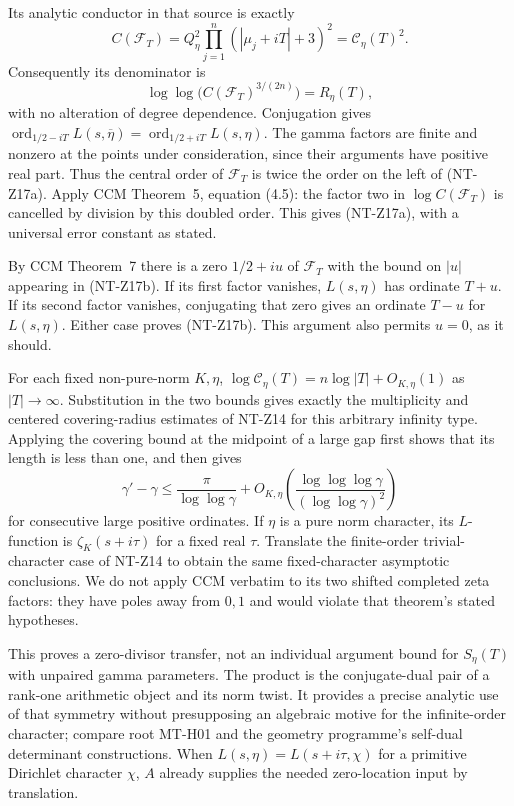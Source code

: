 \documentclass[11pt,a4paper]{article}
\begin{document}
Its analytic conductor in that source is exactly
\[
 C(\mathcal F_T)=Q_\eta^2
       \prod_{j=1}^n(|\mu_j+iT|+3)^2
       =\mathscr C_\eta(T)^2.
\]
Consequently its denominator is
\[
 \log\log\bigl(C(\mathcal F_T)^{3/(2n)}\bigr)
                  =R_\eta(T),
\]
with no alteration of degree dependence.
Conjugation gives
$\operatorname{ord}_{1/2-iT}L(s,\overline\eta)
=\operatorname{ord}_{1/2+iT}L(s,\eta)$.
The gamma factors are finite and nonzero at the points under
consideration, since their arguments have positive real part.
Thus the central order of $\mathcal F_T$ is twice the order on
the left of (NT-Z17a).  Apply CCM Theorem~5, equation (4.5): the
factor two in $\log C(\mathcal F_T)$ is cancelled by division
by this doubled order.  This gives (NT-Z17a), with a universal
error constant as stated.

By CCM Theorem~7 there is a zero $1/2+iu$ of $\mathcal F_T$
with the bound on $|u|$ appearing in (NT-Z17b).  If its first
factor vanishes, $L(s,\eta)$ has ordinate $T+u$.
If its second factor vanishes, conjugating that zero gives an
ordinate $T-u$ for $L(s,\eta)$.  Either case proves (NT-Z17b).
This argument also permits $u=0$, as it should.

For each fixed non-pure-norm $K,\eta$,
$\log\mathscr C_\eta(T)=n\log|T|+O_{K,\eta}(1)$ as
$|T|\to\infty$.  Substitution in the two bounds gives exactly
the multiplicity and centered covering-radius estimates of
NT-Z14 for this arbitrary infinity type.  Applying the covering
bound at the midpoint of a large gap first shows that its length
is less than one, and then gives
\[
 \gamma'-\gamma\le\frac{\pi}{\log\log\gamma}
    +O_{K,\eta}\left(
        \frac{\log\log\log\gamma}{(\log\log\gamma)^2}\right)
\]
for consecutive large positive ordinates.  If $\eta$ is a pure
norm character, its $L$-function is $\zeta_K(s+i\tau)$ for a
fixed real $\tau$.  Translate the finite-order trivial-character
case of NT-Z14 to obtain the same fixed-character asymptotic
conclusions.  We do not apply CCM verbatim to its two shifted
completed zeta factors: they have poles away from $0,1$ and would
violate that theorem's stated hypotheses.

This proves a zero-divisor transfer, not an individual argument
bound for $S_\eta(T)$ with unpaired gamma parameters.  The product
is the conjugate-dual pair of a rank-one arithmetic object and its
norm twist.  It provides a precise analytic use of that symmetry
without presupposing an algebraic motive for the infinite-order
character; compare root MT-H01 and the geometry programme's
self-dual determinant constructions.
When $L(s,\eta)=L(s+i\tau,\chi)$ for a primitive Dirichlet
character $\chi$, $A$ already supplies the needed zero-location
input by translation.
\end{document}
